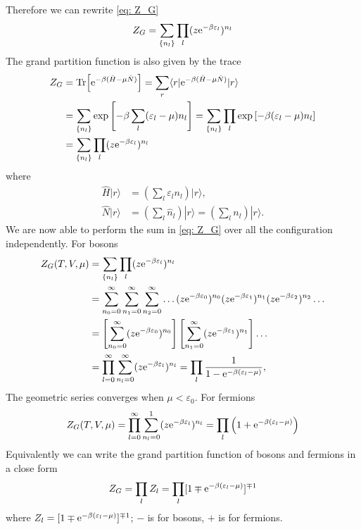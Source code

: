 \documentclass[10pt]{article}
\begin{document}
Therefore we can rewrite \eqref{eq: Z_G}
\begin{equation}
	Z_G = \sum_{\{ n_l \}} \prod_l (z {\mathrm{e}}^{-\beta \varepsilon_l})^{n_l}
\end{equation}
The grand partition function is also given by the trace
\begin{align*}
	Z_G &= \Tr[{\mathrm{e}}^{-\beta(\hat{H} - \mu \hat{N})}] = \sum_r \langle r | {\mathrm{e}}^{-\beta(\hat{H} - \mu \hat{N})} | r \rangle \\
	&= \sum_{\{ n_l \}} \exp\left[-\beta \sum_l ( \varepsilon_l - \mu)n_l \right] = \sum_{\{ n_l \}} \prod_l \exp\left[-\beta ( \varepsilon_l - \mu)n_l \right] \\
	&= \sum_{\{ n_l \}} \prod_l (z {\mathrm{e}}^{-\beta \varepsilon_l})^{n_l}
\end{align*}
where
\begin{align}
	\hat{H} | r \rangle &= \left(\sum_l \varepsilon_l n_l\right) | r \rangle, \\
	\hat{N} | r \rangle &= \left(\sum_l \hat{n}_l\right) | r \rangle = \left(\sum_l n_l\right) | r \rangle.
\end{align}
We are now able to perform the sum in \eqref{eq: Z_G} over all the configuration independently.
For bosons
\begin{align*}
	Z_{G}(T,V, \mu) &= \sum_{\{ n_l \}} \prod_l (z {\mathrm{e}}^{-\beta \varepsilon_l})^{n_l} \\
	&= \sum_{n_0 = 0}^{\infty} \sum_{n_1 = 0}^{\infty} \sum_{n_2 = 0}^{\infty} \dots (z {\mathrm{e}}^{-\beta \varepsilon_0})^{n_0} (z {\mathrm{e}}^{-\beta \varepsilon_1})^{n_1} (z {\mathrm{e}}^{-\beta \varepsilon_2})^{n_2} \dots \\
	&= \left[ \sum_{n_0 = 0}^{\infty} (z {\mathrm{e}}^{-\beta \varepsilon_0})^{n_0} \right] \left[ \sum_{n_1 = 0}^{\infty} (z {\mathrm{e}}^{-\beta \varepsilon_1})^{n_1} \right] \dots \\
	&= \prod_{l=0}^{\infty} \sum_{n_l = 0}^{\infty} (z {\mathrm{e}}^{-\beta \varepsilon_l})^{n_l} =
	\prod_l \frac{1}{1 - {\mathrm{e}}^{-\beta(\varepsilon_l - \mu)}},
\end{align*}
The geometric series converges when $\mu < \varepsilon_0$. For fermions
\begin{equation}
	Z_{G}(T,V, \mu) = \prod_{l=0}^{\infty} \sum_{n_l = 0}^{1} (z {\mathrm{e}}^{-\beta \varepsilon_l})^{n_l} =
	\prod_l \left(1 + {\mathrm{e}}^{-\beta(\varepsilon_l - \mu)}\right)
\end{equation}
Equivalently we can write the grand partition function of bosons and fermions in a close form
\begin{equation}
	Z_G = \prod_l Z_l = \prod_l [1 \mp {\mathrm{e}}^{-\beta(\varepsilon_l - \mu)}]^{\mp 1}
\end{equation}
where $Z_l = [1 \mp {\mathrm{e}}^{-\beta(\varepsilon_l - \mu)}]^{\mp 1}$; $-$ is for bosons, $+$ is for fermions.
\end{document}
